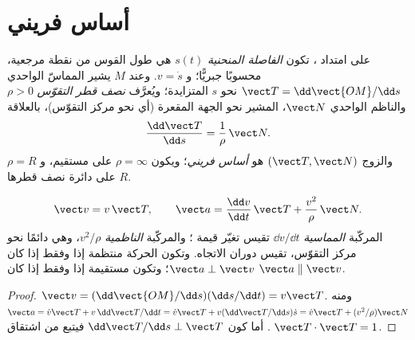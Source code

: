 \section{أساس فريني}

\begin{definition}\label{def:b1:point-kinematics:frenet}
على امتداد ، تكون \emph{الفاصلة المنحنية} $s(t)$ هي طول
القوس من نقطة مرجعية، محسوبًا جبريًّا؛ و $v = \dot s$. وعند
$M$ يشير المماسّ الواحدي $\vect T = \dd\vect{OM}/\dd s$ نحو
$s$ المتزايدة؛ ويُعرَّف \emph{نصف قطر التقوّس} $\rho > 0$ والناظم
الواحدي $\vect N$، المشير نحو الجهة المقعرة (أي نحو مركز
التقوّس)، بالعلاقة
\[
\frac{\dd\vect T}{\dd s} = \frac{1}{\rho}\,\vect N .
\]
والزوج $(\vect T, \vect N)$ هو \emph{أساس فريني}؛ ويكون $\rho = \infty$ على
مستقيم، و $\rho = R$ على دائرة نصف قطرها $R$.
\end{definition}

\begin{theorem}\label{thm:b1:point-kinematics:frenet}
\[
\vect v = v\,\vect T, \qquad
\vect a = \frac{\dd v}{\dd t}\,\vect T + \frac{v^2}{\rho}\,\vect N .
\]
المركّبة \emph{المماسية} $\dd v/\dd t$ تقيس  تغيّر
قيمة ؛ والمركّبة \emph{الناظمية} $v^2/\rho$، وهي دائمًا نحو
مركز التقوّس، تقيس  دوران الاتجاه. وتكون الحركة
منتظمة إذا وفقط إذا كان $\vect a \perp \vect v$؛ وتكون مستقيمة إذا وفقط إذا كان
$\vect a \parallel \vect v$.
\end{theorem}

\begin{proof}
$\vect v = (\dd\vect{OM}/\dd s)(\dd s/\dd t) = v\vect T$. ومنه $\vect a =
\dot v\vect T + v\,\dd\vect T/\dd t = \dot v\vect T + v(\dd\vect T/\dd s)\dot s
= \dot v\vect T + (v^2/\rho)\vect N$. أما كون $\dd\vect T/\dd s \perp \vect T$
فيتبع من اشتقاق $\vect T\cdot\vect T = 1$.
\end{proof}

